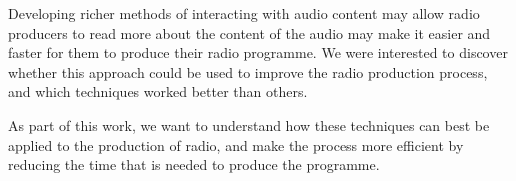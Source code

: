 Developing richer methods of interacting with audio content may allow radio producers to read more about the content of
the audio may make it easier and faster for them to produce their radio programme.
We were interested to discover whether this approach could be used to improve the radio
production process, and which techniques worked better than others.

As part of this work, we want
to understand how these techniques can best be applied to the production of radio, and make the process more efficient
by reducing the time that is needed to produce the programme. 






